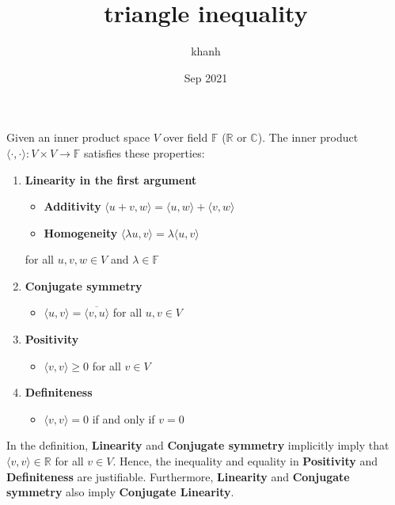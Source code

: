 \documentclass{article}
\title{triangle inequality}
\author{khanh}
\date{Sep 2021}
\begin{document}
    \maketitle

    Given an inner product space $V$ over field $\mathbb{F}$ ($\mathbb{R}$ or $\mathbb{C}$).
    The inner product $\langle \cdot, \cdot \rangle: V \times V \to \mathbb{F}$ satisfies these properties:

    \begin{enumerate}
        \item \textbf{Linearity in the first argument}
        \begin{itemize}
            \item \textbf{Additivity} $\langle u + v, w \rangle = \langle u, w \rangle + \langle v, w \rangle$
            \item \textbf{Homogeneity} $\langle \lambda u, v \rangle = \lambda \langle u, v \rangle$
        \end{itemize}
        
        for all $u, v, w \in V$ and $\lambda \in \mathbb{F}$
        
        \item \textbf{Conjugate symmetry}
        \begin{itemize}
            \item $\langle u, v \rangle = \overline{\langle v, u \rangle}$ for all $u, v \in V$
        \end{itemize}
        
        \item \textbf{Positivity}
        \begin{itemize}
            \item $\langle v, v \rangle \geq 0$ for all $v \in V$
        \end{itemize}
        
        \item \textbf{Definiteness}
        \begin{itemize}
            \item $\langle v, v \rangle = 0$ if and only if $v = 0$
        \end{itemize}
    \end{enumerate}
    
    In the definition, \textbf{Linearity} and \textbf{Conjugate symmetry} implicitly imply that $\langle v, v\rangle \in \mathbb{R}$ for all $v \in V$. Hence, the inequality and equality in \textbf{Positivity} and \textbf{Definiteness} are justifiable. Furthermore, \textbf{Linearity} and \textbf{Conjugate symmetry} also imply \textbf{Conjugate Linearity}.
    
\end{document}
